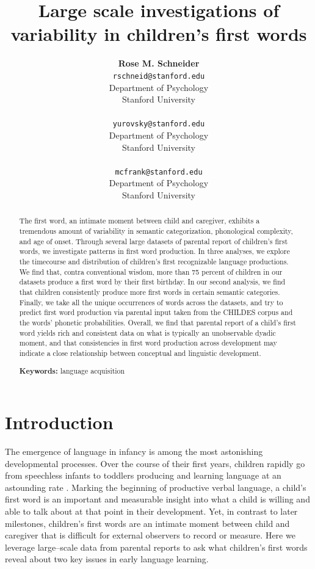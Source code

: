 \documentclass[10pt,letterpaper]{article}
\title{Large scale investigations of variability in children's first words}
\author{{\large \bf Rose M. Schneider} \\ \texttt{rschneid@stanford.edu}\\ Department of Psychology \\ Stanford University \\ 
\And {\large \bf Daniel Yurovsky} \\ \texttt{yurovsky@stanford.edu} \\ Department of Psychology \\ Stanford University \\ 
\And {\large \bf Michael C. Frank} \\ \texttt{mcfrank@stanford.edu} \\ Department of Psychology \\ Stanford University \\ }
\begin{document}
\maketitle


\begin{abstract}
The first word, an intimate moment between child and caregiver, exhibits a tremendous amount of variability in semantic categorization, phonological complexity, and age of onset. Through several large datasets of parental report of children's first words, we investigate patterns in first word production. In three analyses, we explore the timecourse and distribution of children's first recognizable language productions. We find that, contra conventional wisdom, more than 75 percent of children in our datasets produce a first word by their first birthday. In our second analysis, we find that children consistently produce more first words in certain semantic categories. Finally, we take all the unique occurrences of words across the datasets, and try to predict first word production via parental input taken from the CHILDES corpus and the words' phonetic probabilities. Overall, we find that parental report of a child's first word yields rich and consistent data on what is typically an unobservable dyadic moment, and that consistencies in first word production across development may indicate a close relationship between conceptual and linguistic development.

\textbf{Keywords:}
language acquisition
\end{abstract}

\section{Introduction}

The emergence of language in infancy is among the most astonishing developmental processes. Over the course of their first years, children rapidly go from speechless infants to toddlers producing and learning language at an astounding rate \cite{fenson1994,bloom2002}. Marking the beginning of productive verbal language, a child's first word is an important and measurable insight into what a child is willing and able to talk about at that point in their development.  Yet, in contrast to later milestones, children's first words are an intimate moment between child and caregiver that is difficult for external observers to record or measure. Here we leverage large--scale data from parental reports to ask what children's first words reveal about two key issues in early language learning. 
\end{document}
